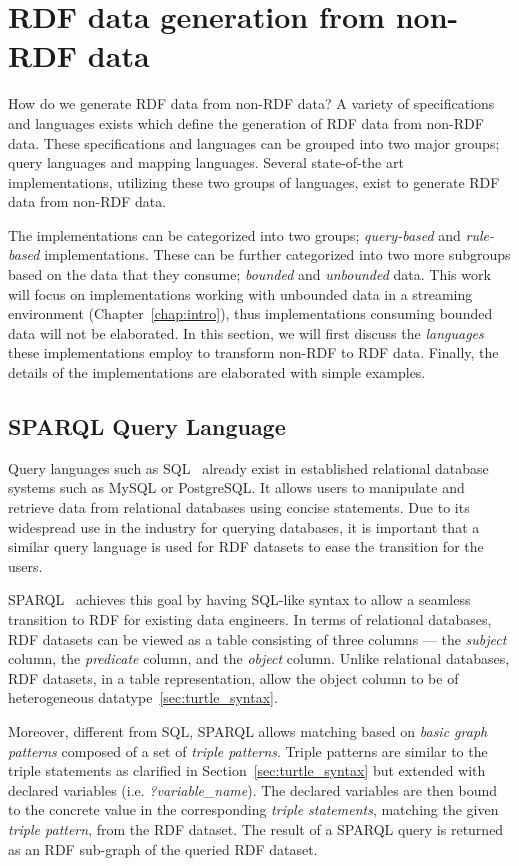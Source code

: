 \chapter{RDF data generation from non-RDF data}
\label{chap:rdf_data_generation}

How do we generate RDF data from non-RDF data? A variety of specifications and languages exists
which define the generation of RDF data from non-RDF data. These specifications and languages can be grouped 
into two major groups; query languages and mapping languages. Several state-of-the art implementations, 
utilizing these two groups of languages, exist to generate RDF data from non-RDF data.

The implementations can be categorized into two groups; \emph{query-based} and 
\emph{rule-based} implementations. These can be further categorized into two more subgroups 
based on the data that they consume; \emph{bounded} and \emph{unbounded} data. 
This work will focus on 
implementations working with unbounded data in a streaming environment (Chapter~\ref{chap:intro}), 
thus implementations 
consuming bounded data will not be elaborated. 
In this section, we will first discuss the \emph{languages} these implementations employ 
to transform non-RDF to RDF data. Finally, the details of the implementations are elaborated 
with simple examples. 


\section{SPARQL Query Language}
Query languages such as SQL~\cite{sql} already exist in established relational database systems such as 
MySQL or PostgreSQL. It allows users to manipulate and retrieve data 
from relational databases using concise statements. Due to its widespread 
use in the industry for querying databases, it is important that a similar 
query language is used for RDF datasets to ease the transition for the users. 

SPARQL~\cite{sparql} achieves this goal by having SQL-like syntax to allow 
a seamless transition to RDF for existing data engineers. 
In terms of relational databases, RDF 
datasets can be viewed as a table consisting of three columns --- the \textit{subject} column, 
the \textit{predicate} column, and the \textit{object} column. Unlike relational databases, 
RDF datasets, in a table representation, allow the object column to be of heterogeneous 
datatype~\ref{sec:turtle_syntax}. 


Moreover, different from SQL, SPARQL allows matching based on \emph{basic graph patterns} composed 
of a set of \emph{triple patterns}. Triple patterns are similar to the triple statements 
as clarified in Section~\ref{sec:turtle_syntax} but extended with declared variables (i.e. \emph{?variable\_name}). 
The declared variables are then bound to the concrete value in the corresponding \emph{triple statements},
matching the given \emph{triple pattern}, from the RDF dataset. 
The result of a SPARQL query is returned as an RDF sub-graph of the queried RDF dataset. 


